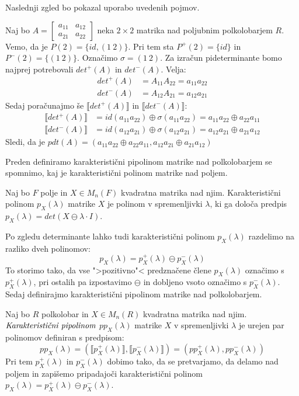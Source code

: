 \documentclass[mat1]{fmfdelo}
\newcommand{\pojem}[1]{\ensuremath{\emph{#1}}}
\begin{document}
Naslednji zgled bo pokazal uporabo uvedenih pojmov.
\begin{zgled}\label{zgled:matA1}
	Naj bo $A = \begin{bmatrix}
		a_{11} & a_{12} \\
		a_{21} & a_{22}
	\end{bmatrix}$ neka $2\times 2$ matrika nad poljubnim polkolobarjem $R$. Vemo, da je $P(2) = \{id, (1~2)\}$. Pri tem sta $P^{+}(2) = \{id\}$ in $P^{-}(2) = \{(1~2)\}$. Označimo $\sigma = (1~2)$.
	Za izračun pideterminante bomo najprej potrebovali $det^{+}(A)$ in $det^{-}(A)$. Velja: \begin{align*}
		det^{+}(A) &= A_{11}A_{22} = a_{11}a_{22} \\
		det^{-}(A) &= A_{12}A_{21} = a_{12}a_{21}
	\end{align*}
	Sedaj poračunajmo še $\llbracket det^{+}(A) \rrbracket$ in $\llbracket det^{-}(A) \rrbracket$:
	\begin{align*}
		\llbracket det^{+}(A) \rrbracket &= id(a_{11}a_{22}) \oplus \sigma(a_{11}a_{22}) = a_{11}a_{22} \oplus a_{22}a_{11} \\
		\llbracket det^{-}(A) \rrbracket &= id(a_{12}a_{21}) \oplus \sigma(a_{12}a_{21}) = a_{12}a_{21} \oplus a_{21}a_{12}
	\end{align*}
	Sledi, da je $pdt(A) = (a_{11}a_{22} \oplus a_{22}a_{11}, a_{12}a_{21} \oplus a_{21}a_{12})$
\end{zgled}


Preden definiramo karakteristični pipolinom matrike nad polkolobarjem se spomnimo, kaj je karakteristični polinom matrike nad poljem.

\begin{definicija}
	Naj bo $F$ polje in $X\in M_n(F)$ kvadratna matrika nad njim. Karakteristični polinom $p_X(\lambda)$ matrike $X$ je polinom v spremenljivki $\lambda$, ki ga določa predpis $p_X(\lambda) = det(X \ominus \lambda\cdot I)$.
\end{definicija}
 
 Po zgledu determinante lahko tudi karakteristični polinom $p_X(\lambda)$ razdelimo na razliko dveh polinomov: $$p_X(\lambda) = p_X^{+}(\lambda) \ominus p_X^{-}(\lambda)$$
 To storimo tako, da vse ">pozitivno"< predznačene člene $p_X(\lambda)$ označimo s $p_X^{+}(\lambda)$, pri ostalih pa izpostavimo $\ominus$ in dobljeno vsoto označimo s $p_X^{-}(\lambda)$.
 Sedaj definirajmo karakteristični pipolinom matrike nad polkolobarjem.

\begin{definicija}
	Naj bo $R$ polkolobar in $X\in M_n(R)$ kvadratna matrika nad njim. \pojem{Karakteristični pipolinom} $pp_X(\lambda)$ matrike $X$ v spremenljivki $\lambda$ je urejen par polinomov definiran s predpisom: $$pp_X(\lambda) = (\llbracket p_X^{+}(\lambda)\rrbracket, \llbracket p_X^{-}(\lambda)\rrbracket) = (pp_X^{+}(\lambda), pp_X^{-}(\lambda))$$
	Pri tem $p_X^{+}(\lambda)$ in $p_X^{-}(\lambda)$ dobimo tako, da se pretvarjamo, da delamo nad poljem in zapišemo pripadajoči karakteristični polinom $p_X(\lambda) = p_X^{+}(\lambda) \ominus p_X^{-}(\lambda)$.
\end{definicija}
\end{document}
